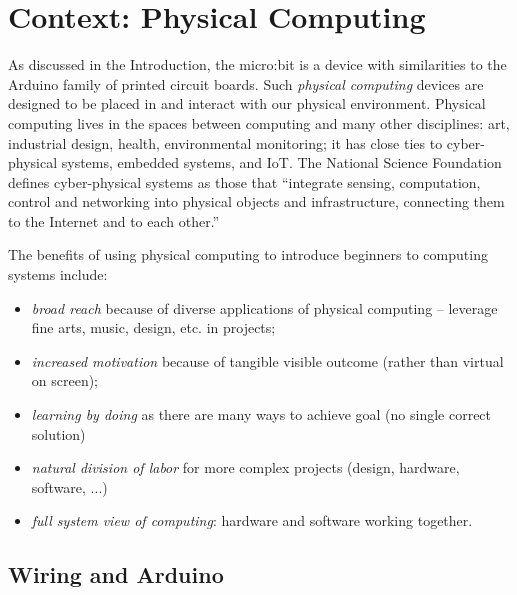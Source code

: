 \section{Context: Physical Computing}
\label{sec:physical}

As discussed in the Introduction, the micro:bit is a device
with similarities to the Arduino family of printed 
circuit boards. Such {\em physical computing} devices
are designed to be placed in and interact with our physical environment. 
Physical computing lives in the spaces between computing and many other disciplines:
art, industrial design, health, environmental monitoring; it has
close ties to cyber-physical systems, embedded systems, and IoT. The National
Science Foundation
defines cyber-physical systems as those that ``integrate sensing, computation, 
control and networking into physical objects and infrastructure, 
connecting them to the Internet and to each other.''\cite{NSF}


%

The benefits of using physical computing to introduce beginners to computing systems include:
\begin{itemize}
\item {\em broad reach} because of diverse applications of physical computing -- leverage fine arts, music, design, etc. in projects;
\item {\em increased motivation} because of tangible visible outcome (rather than virtual on screen);
\item {\em learning by doing} as there are many ways to achieve goal (no single correct solution)
\item {\em natural division of labor} for more complex projects (design, hardware, software, ...)
\item {\em full system view of computing}: hardware and software working together.
\end{itemize}

\subsection{Wiring and Arduino}



